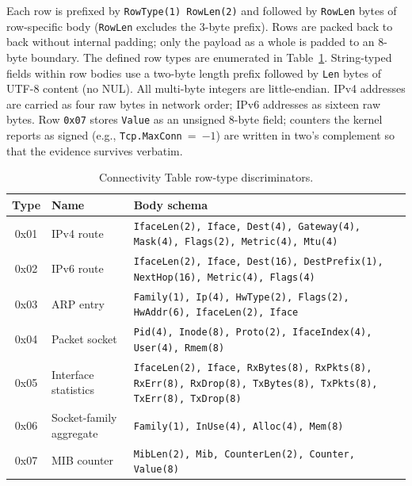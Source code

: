 \documentclass[11pt,a4paper]{article}
\newcommand{\hex}[1]{\texttt{0x#1}}
\begin{document}
Each row is prefixed by \texttt{RowType(1)\,RowLen(2)} and followed by
\texttt{RowLen} bytes of row-specific body (\texttt{RowLen} excludes the
3-byte prefix). Rows are packed back to back without internal padding;
only the payload as a whole is padded to an 8-byte boundary. The defined
row types are enumerated in Table~\ref{tab:block:ct-rows}. String-typed
fields within row bodies use a two-byte length prefix followed by
\texttt{Len} bytes of UTF-8 content (no NUL). All multi-byte integers are
little-endian. IPv4 addresses are carried as four raw bytes in network
order; IPv6 addresses as sixteen raw bytes. Row \hex{07} stores
\texttt{Value} as an unsigned 8-byte field; counters the kernel reports as
signed (e.g., \texttt{Tcp.MaxConn}~=~$-1$) are written in two's complement
so that the evidence survives verbatim.

\begin{table}[H]\centering\caption{Connectivity Table row-type discriminators.}\label{tab:block:ct-rows}\small
\begin{tabular}{c l p{9.2cm}}\toprule
\textbf{Type} & \textbf{Name} & \textbf{Body schema} \\\midrule
0x01 & IPv4 route &
  \texttt{IfaceLen(2), Iface, Dest(4), Gateway(4), Mask(4), Flags(2), Metric(4), Mtu(4)} \\
0x02 & IPv6 route &
  \texttt{IfaceLen(2), Iface, Dest(16), DestPrefix(1), NextHop(16), Metric(4), Flags(4)} \\
0x03 & ARP entry &
  \texttt{Family(1), Ip(4), HwType(2), Flags(2), HwAddr(6), IfaceLen(2), Iface} \\
0x04 & Packet socket &
  \texttt{Pid(4), Inode(8), Proto(2), IfaceIndex(4), User(4), Rmem(8)} \\
0x05 & Interface statistics &
  \texttt{IfaceLen(2), Iface, RxBytes(8), RxPkts(8), RxErr(8), RxDrop(8), TxBytes(8), TxPkts(8), TxErr(8), TxDrop(8)} \\
0x06 & Socket-family aggregate &
  \texttt{Family(1), InUse(4), Alloc(4), Mem(8)} \\
0x07 & MIB counter &
  \texttt{MibLen(2), Mib, CounterLen(2), Counter, Value(8)} \\\bottomrule
\end{tabular}\end{table}
\end{document}

